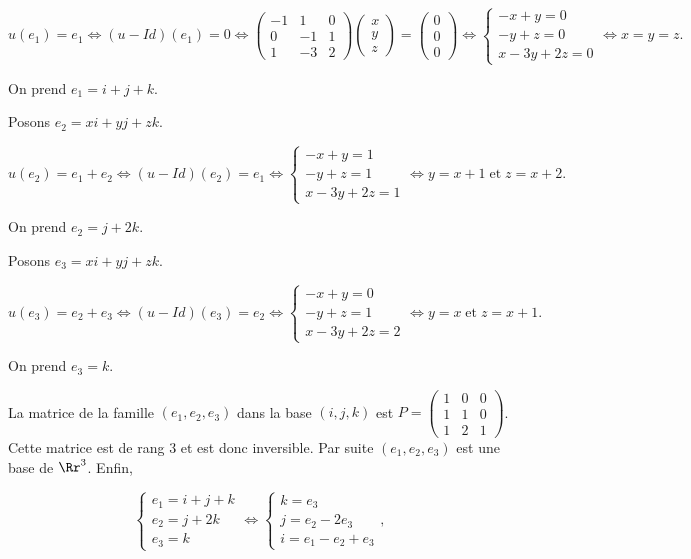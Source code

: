 {\begin{enumerate}
{$$u(e_1)=e_1\Leftrightarrow(u-Id)(e_1)=0\Leftrightarrow\left(
\begin{array}{ccc}
-1&1&0\\
0&-1&1\\
1&-3&2
\end{array}
\right)\left(
\begin{array}{c}
x\\
y\\
z
\end{array}
\right)=\left(
\begin{array}{c}
0\\
0\\
0
\end{array}
\right)\Leftrightarrow
\left\{
\begin{array}{l}
-x+y=0\\
-y+z=0\\
x-3y+2z=0
\end{array}
\right.\Leftrightarrow x=y=z.$$

On prend $e_1=i+j+k$.

Posons $e_2=xi+yj+zk$.

$$u(e_2)=e_1+e_2\Leftrightarrow(u-Id)(e_2)=e_1\Leftrightarrow
\left\{
\begin{array}{l}
-x+y=1\\
-y+z=1\\
x-3y+2z=1
\end{array}
\right.\Leftrightarrow y=x+1\;\mbox{et}\;z=x+2.$$

On prend $e_2=j+2k$.

Posons $e_3=xi+yj+zk$.

$$u(e_3)=e_2+e_3\Leftrightarrow(u-Id)(e_3)=e_2\Leftrightarrow
\left\{
\begin{array}{l}
-x+y=0\\
-y+z=1\\
x-3y+2z=2
\end{array}
\right.\Leftrightarrow y=x\;\mbox{et}\;z=x+1.$$

On prend $e_3=k$.

La matrice de la famille $(e_1,e_2,e_3)$ dans la base $(i,j,k)$ est $P=
\left(
\begin{array}{ccc}
1&0&0\\
1&1&0\\
1&2&1
\end{array}
\right)$. Cette matrice est de rang $3$ et est donc inversible. Par suite $(e_1,e_2,e_3)$ est une base de $\Rr^3$. Enfin,

$$\left\{
\begin{array}{l}
e_1=i+j+k\\
e_2=j+2k\\
e_3=k
\end{array}
\right.
\Leftrightarrow
\left\{
\begin{array}{l}
k=e_3\\
j=e_2-2e_3\\
i=e_1-e_2+e_3
\end{array}
\right.
,$$

}
\end{enumerate}}

